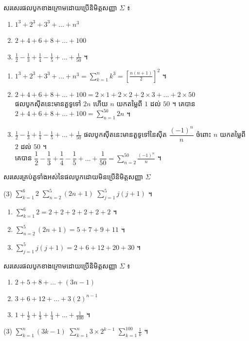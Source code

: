 \begin{example}[លំហាត់គំរូ ១]
សរសេរផលបូកខាងក្រោមដោយប្រើនិមិត្តសញ្ញា $\Sigma$ ៖
\begin{enumerate}[a]
  \item $1^3 + 2^3 + 3^3 + \ldots + n^3$
  \item $2 + 4 + 6 + 8 + \ldots + 100$
  \item $\frac{1}{2} - \frac{1}{3} + \frac{1}{4} - \frac{1}{5} + \ldots + \frac{1}{50}$ ។
\end{enumerate}
\end{example}
\ans
\begin{enumerate}[a]
  \item $1^3 + 2^3 + 3^3 + \ldots + n^3 = \displaystyle\sum_{k=1}^{n} k^3 = \left[\frac{n(n+1)}{2}\right]^2$ ។
  \item $2 + 4 + 6 + 8 + \ldots + 100 = 2 \times 1 + 2 \times 2 + 2 \times 3 + \ldots + 2 \times 50$\\
  ផលបូកស៊ីតនេះមានតួទូទៅ $2n$ ហើយ $n$ យកតម្លៃពី $1$ ដល់ $50$ ។ គេបាន $2 + 4 + 6 + 8 + \ldots + 100 = \displaystyle\sum_{n=1}^{50} 2n$ ។
  \item $\frac{1}{2} - \frac{1}{3} + \frac{1}{4} - \frac{1}{5} + \ldots + \frac{1}{50}$ ផលបូកស៊ីតនេះមានតួទូទៅនៃស៊ីត $\dfrac{(-1)^n}{n}$ ចំពោះ $n$ យកតម្លៃពី $2$ ដល់ $50$ ។\\
  គេបាន $\dfrac{1}{2} - \dfrac{1}{3} + \dfrac{1}{4} - \dfrac{1}{5} + \ldots + \dfrac{1}{50} = \displaystyle\sum_{n=2}^{50} \frac{(-1)^n}{n}$ ។
\end{enumerate}

\begin{example}[លំហាត់គំរូ ២]
សរសេរគ្រប់តួទាំងអស់នៃផលបូកដោយមិនប្រើនិមិត្តសញ្ញា $\Sigma$
\begin{tasks}(3)
  \task $\displaystyle\sum_{k=1}^{6} 2$
  \task $\displaystyle\sum_{n=2}^{5} (2n + 1)$
  \task $\displaystyle\sum_{j=1}^{5} j(j+1)$ ។
\end{tasks}
\end{example}
\ans
\begin{enumerate}[a]
  \item $\displaystyle\sum_{k=1}^{6} 2 = 2 + 2 + 2 + 2 + 2 + 2$ ។
  \item $\displaystyle\sum_{n=2}^{5} (2n + 1) = 5 + 7 + 9 + 11$ ។
  \item $\displaystyle\sum_{j=1}^{5} j(j+1) = 2 + 6 + 12 + 20 + 30$ ។
\end{enumerate}

\begin{pro}
សរសេរផលបូកខាងក្រោមដោយប្រើនិមិត្តសញ្ញា $\Sigma$ ៖
\begin{enumerate}[a]
  \item $2 + 5 + 8 + \ldots + (3n - 1)$
  \item $3 + 6 + 12 + \ldots + 3(2)^{n-1}$
  \item $1 + \frac{1}{2} + \frac{1}{3} + \frac{1}{4} + \ldots + \frac{1}{100}$ ។
\end{enumerate}
\ans
\begin{tasks}(3)
  \task $\displaystyle\sum_{k=1}^{n} (3k - 1)$
  \task $\displaystyle\sum_{k=1}^{n} 3 \times 2^{k-1}$
  \task $\displaystyle\sum_{k=1}^{100} \frac{1}{k}$ ។
\end{tasks}
\end{pro}

